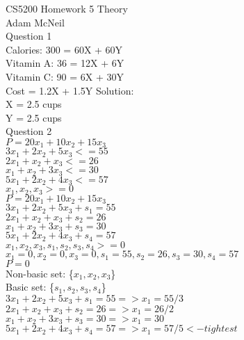 \documentclass{article}
\begin{document}
CS5200 Homework 5 Theory \\
Adam McNeil \\
Question 1 \\
Calories: 300 = 60X + 60Y \\
Vitamin A: 36 = 12X + 6Y \\ 
Vitamin C: 90 = 6X + 30Y \\
Cost = 1.2X + 1.5Y
Solution:\\
X = 2.5 cups\\
Y = 2.5 cups\\

Question 2\\
${P = 20x_1 + 10x_2 + 15x_3}$ \\
${     3x_1 +  2x_2 +  5x_3 <= 55}$\\
${     2x_1 +   x_2 +   x_3 <= 26}$\\
${      x_1 +   x_2 +  3x_3 <= 30}$\\
${     5x_1 +  2x_2 +  4x_3 <= 57}$\\
${      x_1 ,   x_2 ,   x_3 >=  0}$\\


${P = 20x_1 + 10x_2 + 15x_3}$ \\
${     3x_1 +  2x_2 +  5x_3 + s_1 = 55}$\\
${     2x_1 +   x_2 +   x_3 + s_2 = 26}$\\
${      x_1 +   x_2 +  3x_3 + s_3 = 30}$\\
${     5x_1 +  2x_2 +  4x_3 + s_4 = 57}$\\
${      x_1 ,   x_2 ,   x_3, s_1, s_2, s_3, s_4 >=  0}$\\

${      x_1 = 0, x_2 = 0, x_3 = 0, s_1 = 55, s_2 = 26, s_3 = 30, s_4 = 57}$\\
${P = 0}$\\
Non-basic set: \{${x_1, x_2, x_3}$\}\\
Basic set: \{${s_1, s_2, s_3, s_4}$\}\\

${     3x_1 +  2x_2 +  5x_3 + s_1 = 55 => x_1=55/3}$\\
${     2x_1 +   x_2 +   x_3 + s_2 = 26 => x_1=26/2}$\\
${      x_1 +   x_2 +  3x_3 + s_3 = 30 => x_1=30  }$\\
${     5x_1 +  2x_2 +  4x_3 + s_4 = 57 => x_1=57/5 <- tightest}$\\
\end{document}
